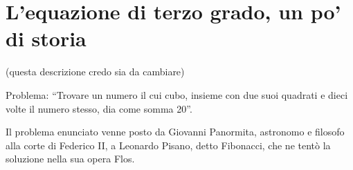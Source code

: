 % 
% 
% 
% 
% 
% 


\section{L'equazione di terzo grado, un po' di storia}
\label{sec:eq2gr_gradosup}(questa descrizione credo sia da cambiare)

Problema: ``Trovare un numero il cui cubo, insieme con due suoi quadrati e 
dieci 
volte il numero stesso, dia come somma 20''.

Il problema enunciato venne posto da Giovanni Panormita, astronomo e filosofo 
alla corte di Federico II, a Leonardo Pisano, detto Fibonacci, che ne tentò la 
soluzione nella sua opera Flos.

